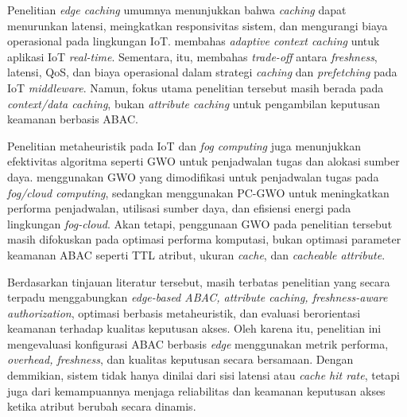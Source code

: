 Penelitian \textit{edge caching} umumnya menunjukkan bahwa \textit{caching} dapat menurunkan latensi, meingkatkan responsivitas sistem, dan mengurangi biaya operasional pada lingkungan IoT. \textcite{weerasinghe_adaptive_2023} membahas \textit{adaptive context caching} untuk aplikasi IoT \textit{real-time}. Sementara, itu, \textcite{medvedev_refresh_2023} membahas \textit{trade-off} antara \textit{freshness}, latensi, QoS, dan biaya operasional dalam strategi \textit{caching} dan \textit{prefetching} pada IoT \textit{middleware}. Namun, fokus utama penelitian tersebut masih berada pada \textit{context/data caching}, bukan \textit{attribute caching} untuk pengambilan keputusan keamanan berbasis ABAC.

Penelitian metaheuristik pada IoT dan \textit{fog computing} juga menunjukkan efektivitas algoritma seperti GWO untuk penjadwalan tugas dan alokasi sumber daya. \textcite{alsadie_modified_2025} menggunakan GWO yang dimodifikasi untuk penjadwalan tugas pada \textit{fog/cloud computing}, sedangkan \textcite{alsamarai_improved_2024} menggunakan PC-GWO untuk meningkatkan performa penjadwalan, utilisasi sumber daya, dan efisiensi energi pada lingkungan \textit{fog-cloud}. Akan tetapi, penggunaan GWO pada penelitian tersebut masih difokuskan pada optimasi performa komputasi, bukan optimasi parameter keamanan ABAC seperti TTL atribut, ukuran \textit{cache}, dan \textit{cacheable attribute}.

Berdasarkan tinjauan literatur tersebut, masih terbatas penelitian yang secara terpadu menggabungkan \textit{edge-based ABAC, attribute caching, freshness-aware authorization}, optimasi berbasis metaheuristik, dan evaluasi berorientasi keamanan terhadap kualitas keputusan akses. Oleh karena itu, penelitian ini mengevaluasi konfigurasi ABAC berbasis \textit{edge} menggunakan metrik performa, \textit{overhead, freshness}, dan kualitas keputusan secara bersamaan. Dengan demmikian, sistem tidak hanya dinilai dari sisi latensi atau \textit{cache hit rate}, tetapi juga dari kemampuannya menjaga reliabilitas dan keamanan keputusan akses ketika atribut berubah secara dinamis.

